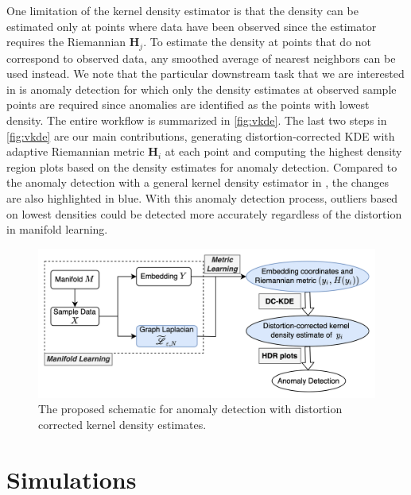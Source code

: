 \documentclass[11pt,a4paper,]{article}
\begin{document}
One limitation of the kernel density estimator is that the density can be estimated only at points where data have been observed since the estimator requires the Riemannian \(\pmb{H}_j\). To estimate the density at points that do not correspond to observed data, any smoothed average of nearest neighbors can be used instead. We note that the particular downstream task that we are interested in is anomaly detection for which only the density estimates at observed sample points are required since anomalies are identified as the points with lowest density. The entire workflow is summarized in \autoref{fig:vkde}. The last two steps in \autoref{fig:vkde} are our main contributions, generating distortion-corrected KDE with adaptive Riemannian metric \(\pmb{H}_i\) at each point and computing the highest density region plots based on the density estimates for anomaly detection. Compared to the anomaly detection with a general kernel density estimator in \textcite{Cheng2021-dh}, the changes are also highlighted in blue. With this anomaly detection process, outliers based on lowest densities could be detected more accurately regardless of the distortion in manifold learning.



\begin{figure}

{\centering \includegraphics[width=0.95\linewidth]{figures/DC-KDE} 

}

\caption{The proposed schematic for anomaly detection with distortion corrected kernel density estimates.}\label{fig:vkde}
\end{figure}

\hypertarget{simulation}{%
\section{Simulations}\label{simulation}}
\end{document}
